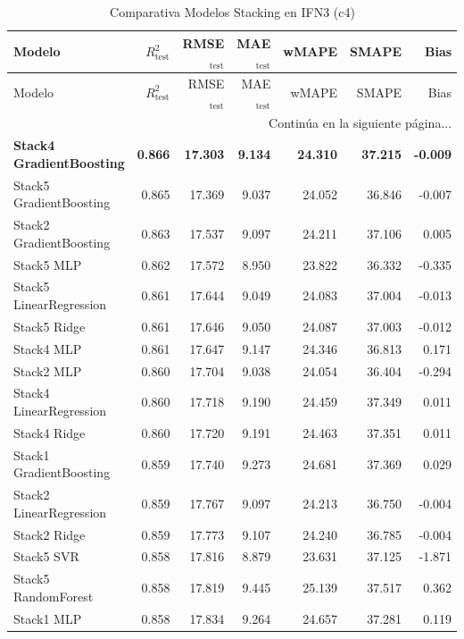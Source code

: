 \begin{longtable}{lrrrrrr}
    \caption{Comparativa Modelos Stacking en IFN3 (c4)}
    \label{tab:stack_comp_ifn3_c4} \\
    \toprule
    Modelo & $R^2_{\text{test}}$ & RMSE$_{\text{test}}$ & MAE$_{\text{test}}$ & wMAPE & SMAPE & Bias \\
    \midrule
    \endfirsthead
    \toprule
    Modelo & $R^2_{\text{test}}$ & RMSE$_{\text{test}}$ & MAE$_{\text{test}}$ & wMAPE & SMAPE & Bias \\
    \midrule
    \endhead
    \midrule
    \multicolumn{7}{r}{{Continúa en la siguiente página...}} \\
    \endfoot
    \bottomrule
    \endlastfoot
    \textbf{Stack4 GradientBoosting} & \textbf{0.866} & \textbf{17.303} & \textbf{9.134} & \textbf{24.310} & \textbf{37.215} & \textbf{-0.009} \\
    Stack5 GradientBoosting & 0.865 & 17.369 & 9.037 & 24.052 & 36.846 & -0.007 \\
    Stack2 GradientBoosting & 0.863 & 17.537 & 9.097 & 24.211 & 37.106 & 0.005 \\
    Stack5 MLP & 0.862 & 17.572 & 8.950 & 23.822 & 36.332 & -0.335 \\
    Stack5 LinearRegression & 0.861 & 17.644 & 9.049 & 24.083 & 37.004 & -0.013 \\
    Stack5 Ridge & 0.861 & 17.646 & 9.050 & 24.087 & 37.003 & -0.012 \\
    Stack4 MLP & 0.861 & 17.647 & 9.147 & 24.346 & 36.813 & 0.171 \\
    Stack2 MLP & 0.860 & 17.704 & 9.038 & 24.054 & 36.404 & -0.294 \\
    Stack4 LinearRegression & 0.860 & 17.718 & 9.190 & 24.459 & 37.349 & 0.011 \\
    Stack4 Ridge & 0.860 & 17.720 & 9.191 & 24.463 & 37.351 & 0.011 \\
    Stack1 GradientBoosting & 0.859 & 17.740 & 9.273 & 24.681 & 37.369 & 0.029 \\
    Stack2 LinearRegression & 0.859 & 17.767 & 9.097 & 24.213 & 36.750 & -0.004 \\
    Stack2 Ridge & 0.859 & 17.773 & 9.107 & 24.240 & 36.785 & -0.004 \\
    Stack5 SVR & 0.858 & 17.816 & 8.879 & 23.631 & 37.125 & -1.871 \\
    Stack5 RandomForest & 0.858 & 17.819 & 9.445 & 25.139 & 37.517 & 0.362 \\
    Stack1 MLP & 0.858 & 17.834 & 9.264 & 24.657 & 37.281 & 0.119 \\

\end{longtable}
